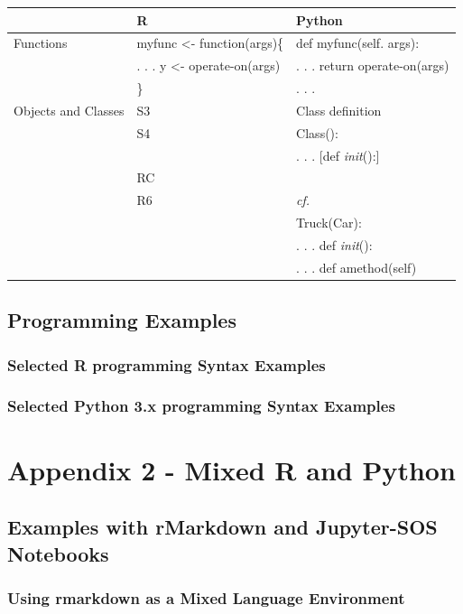 \documentclass[]{book}
\theoremstyle{definition}
\theoremstyle{definition}
\theoremstyle{definition}
\theoremstyle{remark}
\begin{document}

\begin{longtable}[]{@{}lll@{}}
\toprule
& R & Python\tabularnewline
\midrule
\endhead
Functions & myfunc \textless{}- function(args)\{ & def myfunc(self.
args):\tabularnewline
& . . . y \textless{}- operate-on(args) & . . . return
operate-on(args)\tabularnewline
& \} & . . .\tabularnewline
Objects and Classes & S3 & Class definition\tabularnewline
& S4 & Class():\tabularnewline
& & . . . {[}def \emph{init}():{]}\tabularnewline
& RC &\tabularnewline
& R6 & \emph{cf.}\tabularnewline
& & Truck(Car):\tabularnewline
& & . . . def \emph{init}():\tabularnewline
& & . . . def amethod(self)\tabularnewline
\bottomrule
\end{longtable}

\section{Programming Examples}\label{programming-examples}

\subsection{Selected R programming Syntax
Examples}\label{selected-r-programming-syntax-examples}

\subsection{Selected Python 3.x programming Syntax
Examples}\label{selected-python-3.x-programming-syntax-examples}

\chapter{Appendix 2 - Mixed R and
Python}\label{appendix-2---mixed-r-and-python}

\section{Examples with rMarkdown and Jupyter-SOS
Notebooks}\label{examples-with-rmarkdown-and-jupyter-sos-notebooks}

\subsection{Using rmarkdown as a Mixed Language
Environment}\label{using-rmarkdown-as-a-mixed-language-environment}
\end{document}
